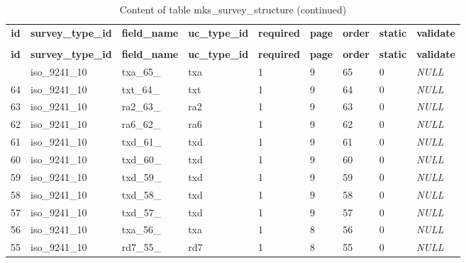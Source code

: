 %
%
 \begin{longtable}{|l|l|l|l|l|l|l|l|l|} 
 \hline \endhead \hline \endfoot \hline 
 \caption{Content of table mks\_survey\_structure} \label{tab:mks_survey_structure-data} \\\hline \multicolumn{1}{|c|}{\textbf{id}} & \multicolumn{1}{|c|}{\textbf{survey\_type\_id}} & \multicolumn{1}{|c|}{\textbf{field\_name}} & \multicolumn{1}{|c|}{\textbf{uc\_type\_id}} & \multicolumn{1}{|c|}{\textbf{required}} & \multicolumn{1}{|c|}{\textbf{page}} & \multicolumn{1}{|c|}{\textbf{order}} & \multicolumn{1}{|c|}{\textbf{static}} & \multicolumn{1}{|c|}{\textbf{validate}} \\ \hline \hline  \endfirsthead 
\caption{Content of table mks\_survey\_structure (continued)} \\ \hline \multicolumn{1}{|c|}{\textbf{id}} & \multicolumn{1}{|c|}{\textbf{survey\_type\_id}} & \multicolumn{1}{|c|}{\textbf{field\_name}} & \multicolumn{1}{|c|}{\textbf{uc\_type\_id}} & \multicolumn{1}{|c|}{\textbf{required}} & \multicolumn{1}{|c|}{\textbf{page}} & \multicolumn{1}{|c|}{\textbf{order}} & \multicolumn{1}{|c|}{\textbf{static}} & \multicolumn{1}{|c|}{\textbf{validate}} \\ \hline \hline \endhead \endfoot
65 & iso\_9241\_10 & txa\_65\_ & txa & 1 & 9 & 65 & 0 & \textit{NULL} \\ \hline 
64 & iso\_9241\_10 & txt\_64\_ & txt & 1 & 9 & 64 & 0 & \textit{NULL} \\ \hline 
63 & iso\_9241\_10 & ra2\_63\_ & ra2 & 1 & 9 & 63 & 0 & \textit{NULL} \\ \hline 
62 & iso\_9241\_10 & ra6\_62\_ & ra6 & 1 & 9 & 62 & 0 & \textit{NULL} \\ \hline 
61 & iso\_9241\_10 & txd\_61\_ & txd & 1 & 9 & 61 & 0 & \textit{NULL} \\ \hline 
60 & iso\_9241\_10 & txd\_60\_ & txd & 1 & 9 & 60 & 0 & \textit{NULL} \\ \hline 
59 & iso\_9241\_10 & txd\_59\_ & txd & 1 & 9 & 59 & 0 & \textit{NULL} \\ \hline 
58 & iso\_9241\_10 & txd\_58\_ & txd & 1 & 9 & 58 & 0 & \textit{NULL} \\ \hline 
57 & iso\_9241\_10 & txd\_57\_ & txd & 1 & 9 & 57 & 0 & \textit{NULL} \\ \hline 
56 & iso\_9241\_10 & txa\_56\_ & txa & 1 & 8 & 56 & 0 & \textit{NULL} \\ \hline 
55 & iso\_9241\_10 & rd7\_55\_ & rd7 & 1 & 8 & 55 & 0 & \textit{NULL} \\ \hline 

\end{longtable}
